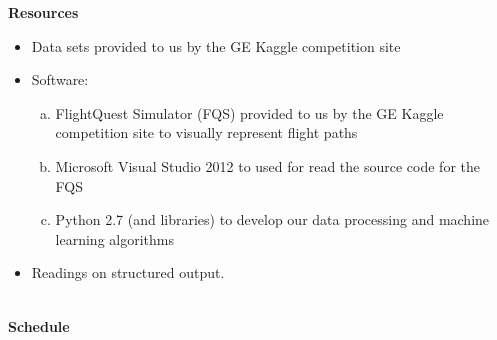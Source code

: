 \documentclass{article}[12pt]
\begin{document}
\Large{\textbf{Resources}}
\begin{itemize}
	\item Data sets provided to us by the GE Kaggle competition site
	\item Software: 
		\begin{enumerate}[(a)]
			\item FlightQuest Simulator (FQS) provided to us by the GE Kaggle competition site to visually represent flight paths
			\item Microsoft Visual Studio 2012 to used for read the source code for the FQS
			\item Python 2.7 (and libraries) to develop our data processing and machine learning algorithms
		\end{enumerate}
	\item Readings on structured output. 
\end{itemize}
\hspace*{\fill}\\
\Large{\textbf{Schedule}}
\end{document}
